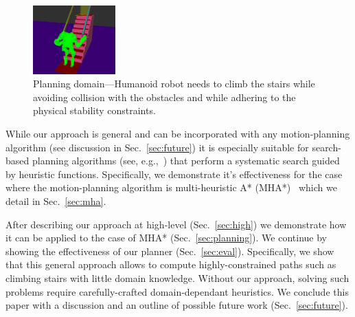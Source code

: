 \documentclass[conference]{IEEEtran}
\begin{document}
% 

\begin{figure}[tb]
  \centering
  	\includegraphics[width=0.283\textwidth]{fig/workspace.png}
  \caption{
		Planning domain---Humanoid robot needs to climb the stairs while avoiding collision with the obstacles and while adhering to the physical stability constraints.
  	\vspace{-15mm}
}
   	\label{fig:robot}
\end{figure}



%

While our approach is general and can be incorporated with any motion-planning algorithm (see discussion in Sec.~\ref{sec:future}) it is especially suitable for search-based planning algorithms (see, e.g.,~\cite{CCL14}) that perform a systematic search guided by heuristic functions.
Specifically, we demonstrate it's effectiveness for the case where the motion-planning algorithm is multi-heuristic A* (MHA*)~\cite{ASNHL16, NAL15} which we detail in Sec.~\ref{sec:mha}.




After describing our approach at high-level (Sec.~\ref{sec:high}) we demonstrate how it can be applied to the case of MHA* (Sec.~\ref{sec:planning}).
We continue by showing the effectiveness of our planner (Sec.~\ref{sec:eval}).
Specifically, we show that this general approach allows to compute highly-constrained paths such as climbing stairs with little domain knowledge.
Without our approach, solving such problems require carefully-crafted domain-dependant heuristics. 
We conclude this paper with a discussion and an outline of possible future work (Sec.~\ref{sec:future}).
\end{document}
